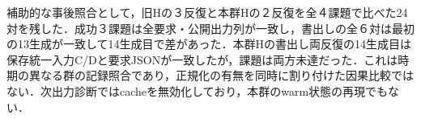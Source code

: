 補助的な事後照合として，旧Hの３反復と本群Hの２反復を全４課題で比べた24対を残した．成功３課題は全要求・公開出力列が一致し，書出しの全６対は最初の13生成が一致して14生成目で差があった．本群Hの書出し両反復の14生成目は保存統一入力C/Dと要求JSONが一致したが，課題は両方未達だった．これは時期の異なる群の記録照合であり，正規化の有無を同時に割り付けた因果比較ではない．次出力診断ではcacheを無効化しており，本群のwarm状態の再現でもない．
